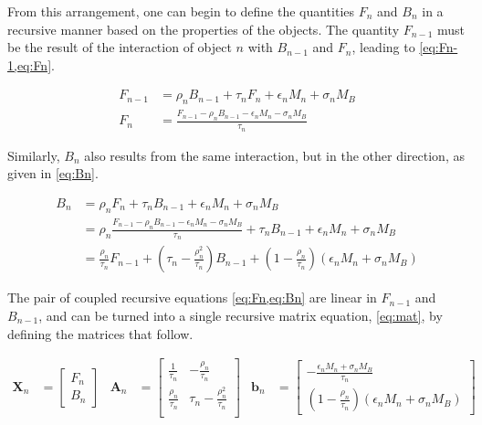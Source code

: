 \documentclass[11pt,a4paper]{article}
\begin{document}
From this arrangement, one can begin to define the quantities $ F_n $ and $ B_n $ in a recursive manner based on the properties of the objects. The quantity $ F_{n-1} $ must be the result of the interaction of object $ n $ with $ B_{n-1} $ and $ F_{n} $, leading to \cref{eq:Fn-1,eq:Fn}.

\begin{align}
	F_{n-1} &= \rho_n B_{n-1} + \tau_n F_n + \epsilon_n M_n + \sigma_n M_B \label{eq:Fn-1} \\
	F_n &= \frac{F_{n-1} - \rho_n B_{n-1} - \epsilon_n M_n - \sigma_n M_B}{\tau_n}\label{eq:Fn}
\end{align}

Similarly, $ B_n $ also results from the same interaction, but in the other direction, as given in \cref{eq:Bn}.

\begin{equation}\label{eq:Bn}
	\begin{split}
		B_n &= \rho_n F_n + \tau_n B_{n-1} + \epsilon_n M_n + \sigma_n M_B \\
		&= \rho_n \frac{F_{n-1} - \rho_n B_{n-1} - \epsilon_n M_n - \sigma_n M_B}{\tau_n} + \tau_n B_{n-1} + \epsilon_n M_n + \sigma_n M_B \\
		&= \frac{\rho_n}{\tau_n} F_{n-1} + \left(\tau_n - \frac{\rho_n^2}{\tau_n}\right) B_{n-1} + \left(1 - \frac{\rho_n}{\tau_n}\right) \left(\epsilon_n M_n + \sigma_n M_B\right)
	\end{split}
\end{equation}

The pair of coupled recursive equations \cref{eq:Fn,eq:Bn} are linear in $ F_{n-1} $ and $ B_{n-1} $, and can be turned into a single recursive matrix equation, \cref{eq:mat}, by defining the matrices that follow.

\begin{align*}
	\bm{X}_n &=
	\begin{bmatrix}
		F_n \\ B_n
	\end{bmatrix}
	&
	\bm{A}_n &=
	\begin{bmatrix}
		\frac{1}{\tau_n} & -\frac{\rho_n}{\tau_n} \\
		\frac{\rho_n}{\tau_n} & \tau_n-\frac{\rho_n^2}{\tau_n} \\
	\end{bmatrix}
	&
	\bm{b}_n &= 
	\begin{bmatrix}
		-\frac{\epsilon_n M_n + \sigma_n M_B}{\tau_n}\\[4pt]
		\left(1 - \frac{\rho_n}{\tau_n}\right) \left(\epsilon_n M_n + \sigma_n M_B\right)
	\end{bmatrix}
\end{align*}
\end{document}
